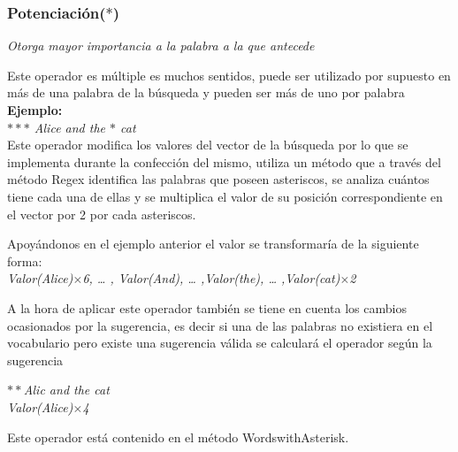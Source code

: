 \documentclass[options]{article}
\begin{document}
\subsubsection{Potenciación($\ast$)}\label{potency}
\begin{center}
    \textit{\small{Otorga mayor importancia a la palabra a la que antecede}}\\
\end{center}
Este operador es múltiple es muchos sentidos, puede ser utilizado por supuesto en más de una palabra de la búsqueda y pueden ser más de uno por palabra \\
\textbf{Ejemplo:}\\
\textit{$\ast \ast \ast$ Alice and the $\ast$ cat}\\
Este operador modifica los valores del vector de la búsqueda por lo que se implementa durante la confección del mismo, utiliza un método que a través del método Regex identifica las palabras que poseen asteriscos, se analiza cuántos tiene cada una de ellas y se multiplica el valor de su posición correspondiente en el vector por 2 por cada asteriscos.
\begin{center}
    Apoyándonos en el ejemplo anterior el valor se transformaría de la siguiente forma:\\
    \textit{Valor(Alice)$\times $6, … , Valor(And), … ,Valor(the), … ,Valor(cat)$\times $2}
\end{center}
A la hora de aplicar este operador también se tiene en cuenta los cambios ocasionados por la sugerencia, es decir si una de las palabras no existiera en el vocabulario pero existe una sugerencia válida se calculará el operador según la sugerencia
\begin{center}
    \textit{$\ast \ast $Alic and the cat}\\
    \textit{Valor(Alice)$\times $4}\\
\end{center}
Este operador está contenido en el método WordswithAsterisk.\\
\end{document}
